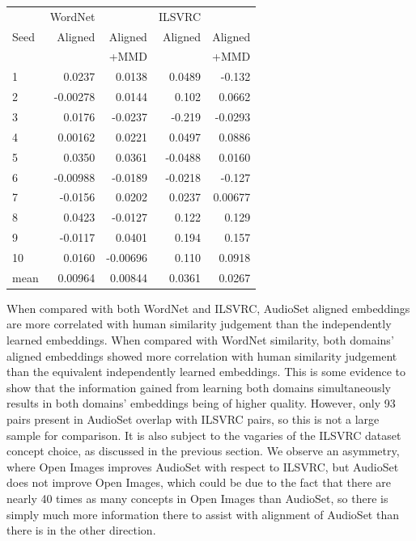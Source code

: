 \begin{table}[H]
\begin{tabular}{lrrrr}
  \toprule
       &     WordNet  &           &  ILSVRC  &            \\
{Seed} &      Aligned &  Aligned  &  Aligned &  Aligned   \\
{}     &               & +MMD     &          &   +MMD     \\
\midrule
1    &    0.0237 &     0.0138  &   0.0489 &    -0.132    \\
2    &   -0.00278 &     0.0144 &   0.102  &     0.0662   \\
3    &    0.0176 &    -0.0237  &  -0.219  &    -0.0293   \\
4    &    0.00162 &     0.0221 &   0.0497 &     0.0886   \\
5    &    0.0350 &     0.0361  &  -0.0488 &     0.0160   \\
6    &   -0.00988 &    -0.0189 &  -0.0218 &    -0.127    \\
7    &   -0.0156 &     0.0202  &   0.0237 &     0.00677  \\
8    &    0.0423 &    -0.0127  &   0.122  &     0.129    \\
9    &   -0.0117 &     0.0401  &   0.194  &     0.157    \\
10   &    0.0160 &    -0.00696 &   0.110  &     0.0918   \\
\midrule                                                                    
mean &    0.00964 &     0.00844 &   0.0361 &     0.0267  \\
\bottomrule
\end{tabular}
\end{table}

When compared with both WordNet and ILSVRC, AudioSet aligned embeddings are more correlated with human similarity judgement than the independently learned embeddings.  When compared with WordNet similarity, both domains' aligned embeddings showed more correlation with human similarity judgement than the equivalent independently learned embeddings. This is some evidence to show that the information gained from learning both domains simultaneously results in both domains' embeddings being of higher quality. However, only 93 pairs present in AudioSet overlap with ILSVRC pairs, so this is not a large sample for comparison. It is also subject to the vagaries of the ILSVRC dataset concept choice, as discussed in the previous section. We observe an asymmetry, where Open Images improves AudioSet with respect to ILSVRC, but AudioSet does not improve Open Images, which could be due to the fact that there are nearly 40 times as many concepts in Open Images than AudioSet, so there is simply much more information there to assist with alignment of AudioSet than there is in the other direction. 

